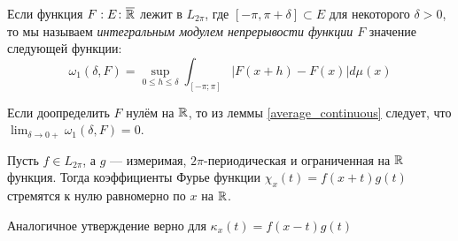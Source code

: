 \begin{definition}
	Если функция $F: E \colon \overline{\mathbb{R}}$ лежит в $L_{2\pi}$, где $[-\pi, \pi + \delta] \subset E$ для некоторого $\delta > 0$, то мы называем \textit{интегральным модулем непрерывости функции $F$} значение следующей функции:
	\[
		\omega_1(\delta, F) = \sup_{0 \le h \le \delta} \int_{[-\pi; \pi]} |F(x + h) - F(x)|d\mu(x)
	\]
\end{definition}

\begin{note}
	Если доопределить $F$ нулём на $\mathbb{R}$, то из леммы \ref{average_continuous} следует, что $\lim_{\delta \to 0+} \omega_1(\delta, F) = 0$.
\end{note}

\begin{lemma} \label{uniconv_lemma}
	Пусть $f \in L_{2\pi}$, а $g$ --- измеримая, $2\pi$-периодическая и ограниченная на $\mathbb{R}$ функция. Тогда коэффициенты Фурье функции $\chi_x(t) = f(x + t)g(t)$ стремятся к нулю равномерно по $x$ на $\mathbb{R}$.
\end{lemma}

\begin{note}
	Аналогичное утверждение верно для $\kappa_x(t) = f(x - t)g(t)$
\end{note}

